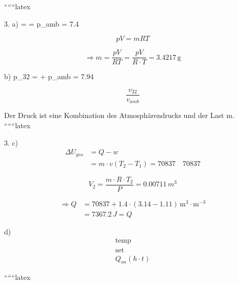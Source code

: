 
``````latex


3. a) \quad \rho =  =  \Rightarrow p_{amb} = 7.4  \, 

\begin{equation*}
pV = mRT
\end{equation*}

\begin{equation*}
\Rightarrow m = \frac{pV}{RT} = \frac{pV}{R \cdot T} = 3.4217 \, \text{g}
\end{equation*}

b) \quad p_{32} =  + p_{amb} = 7.94 \, 

\begin{equation*}
\frac{v_{32}}{v_{amb}}
\end{equation*}

Der Druck ist eine Kombination des Atmosphärendrucks und der Last m.
``````latex


3. c)
\begin{align*}
    \Delta U_{geo} &= Q - w \\
    &= m \cdot v (T_2 - T_1) = 70837 \quad 70837
\end{align*}

\[
V_2 = \frac{m \cdot R \cdot T_2}{P} = 0.00711 \, m^3
\]

\begin{align*}
    \Rightarrow Q &= 70837 + 1.4 \cdot \left( 3.14 - 1.11 \right) \, \text{m}^3 \cdot \text{m}^{-3} \\
    &= 7367.2 \, J = Q
\end{align*}

d)
\begin{align*}
    \text{temp} \\
    \text{set} \\
    Q_{on} \left( h \cdot t \right)
\end{align*}

``````latex


